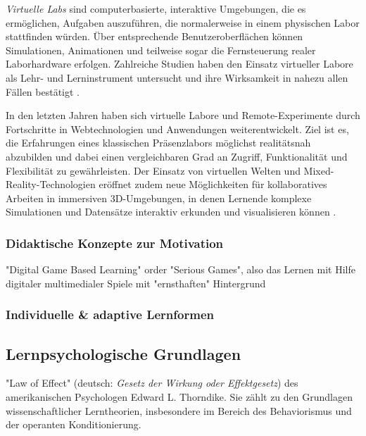 \textit{Virtuelle Labs} sind computerbasierte, interaktive Umgebungen, die es ermöglichen, Aufgaben auszuführen, die normalerweise in einem physischen Labor stattfinden würden. Über entsprechende Benutzeroberflächen können Simulationen, Animationen und teilweise sogar die Fernsteuerung realer Laborhardware erfolgen. Zahlreiche Studien haben den Einsatz virtueller Labore als Lehr- und Lerninstrument untersucht und ihre Wirksamkeit in nahezu allen Fällen bestätigt \parencite[S.~117]{achuthan_value_2011}.

In den letzten Jahren haben sich virtuelle Labore und Remote-Experimente durch Fortschritte in Webtechnologien und Anwendungen weiterentwickelt. Ziel ist es, die Erfahrungen eines klassischen Präsenzlabors möglichst realitätsnah abzubilden und dabei einen vergleichbaren Grad an Zugriff, Funktionalität und Flexibilität zu gewährleisten. Der Einsatz von virtuellen Welten und Mixed-Reality-Technologien eröffnet zudem neue Möglichkeiten für kollaboratives Arbeiten in immersiven 3D-Umgebungen, in denen Lernende komplexe Simulationen und Datensätze interaktiv erkunden und visualisieren können \parencite[S.~1]{savin-baden_understanding_2012}.

\subsubsection{Didaktische Konzepte zur Motivation}



"Digital Game Based Learning" order "Serious Games", also das Lernen mit Hilfe digitaler multimedialer Spiele mit "ernsthaften" Hintergrund \parencite[S.~14]{niegemann_kompendium_2008}

\subsubsection{Individuelle \& adaptive Lernformen}





\subsection{Lernpsychologische Grundlagen}

"Law of Effect" (deutsch: \textit{Gesetz der Wirkung oder Effektgesetz}) des amerikanischen Psychologen Edward L. Thorndike. Sie zählt zu den Grundlagen wissenschaftlicher Lerntheorien, insbesondere im Bereich des Behaviorismus und der operanten Konditionierung.



